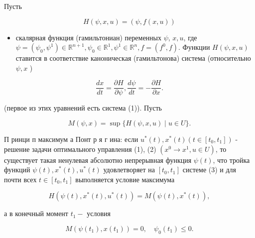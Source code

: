\documentclass[10pt]{article}
\begin{document}
Пусть



\[

H(\psi, x, u)=(\psi, f(x, u))

\]



\begin{itemize}

  \item скалярная функция (гамильтониан) переменных $\psi$, $x, u$, где $\psi=\left(\psi_{0}, \psi^{1}\right) \in \mathbb{R}^{n+1}, \psi_{0} \in \mathbb{R}^{1}, \psi^{1} \in \mathbb{R}^{n}, f=\left(f^{0}, f\right)$. Функции $H(\psi, x, u)$ ставится в соответствие каноническая (гамильтонова) система (относительно $\psi, x$ )

\end{itemize}



\[

\frac{d x}{d t}=\frac{\partial H}{\partial \psi}, \frac{d \psi}{d t}=-\frac{\partial H}{\partial x} .

\]



(первое из этих уравнений есть система (1)). Пусть



\[

M(\psi, x)=\sup \{H(\psi, x, u) \mid u \in U\} .

\]



П ринци п максимум а Понт р я г ина: если $u^{*}(t), x^{*}(t)\left(t \in\left[t_{0}, t_{1}\right]\right)$ - решение задачи оптимального управления (1), (2) $\left(x^{0} \rightarrow x^{1}, u \in U\right)$, то существует такая ненулевая абсолютно непрерывная функция $\psi(t)$, что тройка функций $\psi(t), x^{*}(t), u^{*}(t)$ удовлетворяет на $\left[t_{0}, t_{1}\right]$ системе (3) и для почти всех $t \in\left[t_{0}, t_{1}\right]$ выполняется условие максимума



\[

H\left(\psi(t), x^{*}(t), u^{*}(t)\right)=M\left(\psi(t), x^{*}(t)\right),

\]



а в конечный момент $t_{1}-$ условия



\[

M\left(\psi\left(t_{1}\right), x\left(t_{1}\right)\right)=0, \quad \psi_{0}\left(t_{1}\right) \leqslant 0 .

\]
\end{document}

